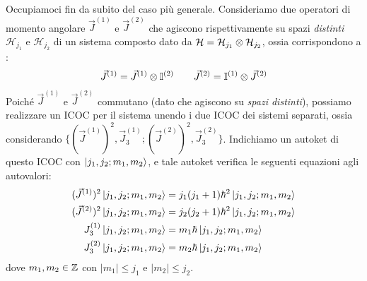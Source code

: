 \documentclass[../../FisicaTeorica.tex]{subfiles}
\begin{document}
Occupiamoci fin da subito del caso più generale. Consideriamo due operatori di momento angolare $\vec{J}^{(1)}$ e $\vec{J}^{(2)}$ che agiscono rispettivamente su spazi \textit{distinti} $\mathcal{H}_{j_1}$ e $\mathcal{H}_{j_2}$ di un sistema composto dato da $\mathcal{H}=\mathcal{H}_{j_1} \otimes \mathcal{H}_{j_2}$, ossia corrispondono a :
\begin{align*}
\vec{J}^{(1)}=\vec{J}^{(1)}\otimes \mathbb{I}^{(2)}\qquad \vec{J}^{(2)}=\mathbb{I}^{(1)}\otimes \vec{J}^{(2)}
\end{align*}
Poiché $\vec{J}^{(1)}$ e $\vec{J}^{(2)}$ commutano (dato che agiscono su \textit{spazi distinti}), possiamo realizzare un ICOC per il sistema unendo i due ICOC dei sistemi separati, ossia considerando $\{(\vec{J}^{(1)})^2, \vec{J}_3^{(1)}; (\vec{J}^{(2)})^2, \vec{J}_3^{(2)} \}$. Indichiamo un autoket di questo ICOC con $\Ket{j_1, j_2; m_1, m_2}$, e tale autoket verifica le seguenti equazioni agli autovalori:
\begin{align*}
(\vec{J}^{(1)})^2 \Ket{j_1, j_2; m_1, m_2} &= j_1(j_1 +1)\hbar^2 \Ket{j_1, j_2; m_1, m_2}\\
(\vec{J}^{(2)})^2 \Ket{j_1, j_2; m_1, m_2} &= j_2(j_2+1)\hbar^2 \Ket{j_1, j_2; m_1, m_2}\\
{J}^{(1)}_3 \Ket{j_1, j_2;m_1, m_2} &= m_1\hbar \Ket{j_1, j_2; m_1, m_2}\\
{J}^{(2)}_3 \Ket{j_1, j_2; m_1, m_2} &= m_2\hbar \Ket{j_1, j_2;m_1, m_2}
\end{align*}
dove $m_1, m_2 \in \mathbb{Z}$ con $|m_1| \leq j_1$ e $|m_2| \leq j_2$.\\
\end{document}
